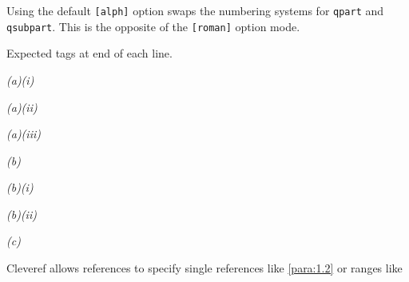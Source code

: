 \documentclass[a4paper,12pt]{article}
\begin{document}
	\maketitle
	
	Using the default \verb|[alph]| option swaps the numbering systems for \verb|qpart| and \verb|qsubpart|. This is the opposite of the \verb|[roman]| option mode.
	
	Expected tags at end of each line.
	
	
	\begin{question}
	\qpart\qsubpart
	\lipsum[1-2] \emph{(a)(i)}\label{para:1.1.1}
	
	\qsubpart
	\lipsum[3-4] \emph{(a)(ii)}\label{para:1.1.2}
	
	\qsubpart
	\lipsum[5-6] \emph{(a)(iii)}\label{para:1.1.3}
	
	\qpart
	\lipsum[7-8] \emph{(b)}\label{para:1.2}
	
	\qsubpart
	\lipsum[9-10] \emph{(b)(i)}\label{para:1.2.1}
	
	\qsubpart
	\lipsum[11-12] \emph{(b)(ii)}\label{para:1.2.2}
	
	\qpart
	\lipsum[13-14] \emph{(c)}\label{para:3}
\end{question}

Cleveref allows references to specify single references like \cref{para:1.2} or ranges like 
\end{document}
